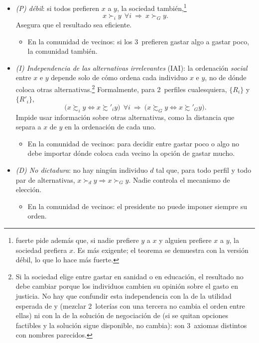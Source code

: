 \documentclass[11pt]{article}
\begin{document}
\begin{itemize}
\begin{itemize}
\begin{itemize}
    \end{itemize}
  \item \emph{(P)  débil}: si todos prefieren $x$ a $y$, la sociedad también,\footnote{ fuerte pide además que, si nadie prefiere $y$ a $x$ y alguien prefiere $x$ a $y$, la sociedad prefiera $x$. Es más exigente; el teorema se demuestra con la versión débil, lo que lo hace más fuerte.}
    $$x\succ_iy\ \ \forall i\ \Rightarrow\ x\succ_Gy.$$
    Asegura que el resultado sea eficiente.
    \begin{itemize}
    \item En la comunidad de vecinos: si los 3~prefieren gastar algo a gastar poco, la comunidad también.
    \end{itemize}
  \item \emph{(\textup{I}) Independencia de las alternativas irrelevantes} (IAI): la ordenación \emph{social} entre $x$ e $y$ depende solo de cómo ordena cada individuo $x$ e $y$, no de dónde coloca otras alternativas.\footnote{Si la sociedad elige entre gastar en sanidad o en educación, el resultado no debe cambiar porque los individuos cambien su opinión sobre el gasto en justicia. No hay que confundir esta independencia con la de la utilidad esperada de  y   (mezclar 2~loterías con una tercera no cambia el orden entre ellas) ni con la de la solución de negociación de   (si se quitan opciones factibles y la solución sigue disponible, no cambia): son 3~axiomas distintos con nombres parecidos.} Formalmente, para 2~perfiles cualesquiera, $\{R_i\}$ y $\{R'_i\}$,
    $$\big(x\succsim_iy\iff x\succsim'_iy\big)\ \ \forall i\ \Rightarrow\ \big(x\succsim_Gy\iff x\succsim'_Gy\big).$$
    Impide usar información sobre otras alternativas, como la distancia que separa a $x$ de $y$ en la ordenación de cada uno.
    \begin{itemize}
    \item En la comunidad de vecinos: para decidir entre gastar poco o algo no debe importar dónde coloca cada vecino la opción de gastar mucho.
    \end{itemize}
  \item \emph{(D) No dictadura}: no hay ningún individuo $d$ tal que, para todo perfil y todo par de alternativas, $x\succ_dy\Rightarrow x\succ_Gy$. Nadie controla el mecanismo de elección.
    \begin{itemize}
    \item En la comunidad de vecinos: el presidente no puede imponer siempre su orden.
    \end{itemize}
  \end{itemize}
\end{itemize}
\end{document}
